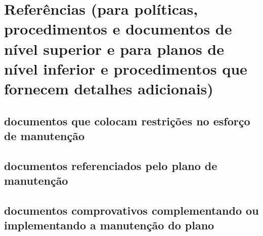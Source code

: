 \chapter{Referências (para políticas, procedimentos e documentos de nível superior e para planos de nível inferior e procedimentos que fornecem detalhes adicionais)}

\section{documentos que colocam restrições no esforço de manutenção}

\section{documentos referenciados pelo plano de manutenção}

\section{documentos comprovativos complementando ou implementando a manutenção do plano}
